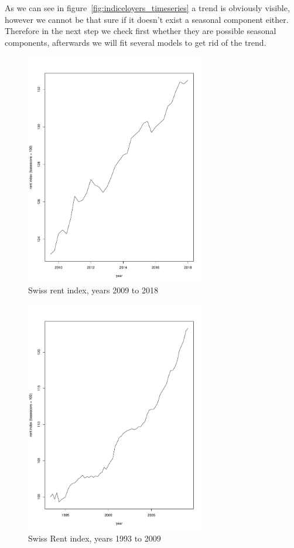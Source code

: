 \documentclass[11pt,a4paper]{article}
\begin{document}
As we can see in figure~\ref{fig:indiceloyers_timeseries} a trend is obviously visible, however we cannot be that sure if it doesn't exist a seasonal component either. Therefore in the next step we check first whether they are possible seasonal components, afterwards we will fit several models to get rid of the trend. 

\begin{figure}[!htb]
\centering
\includegraphics[angle=0,
width=0.7\textwidth]{indiceloyers_test}
\caption{Swiss rent index, years 2009 to 2018\label{fig:indiceloyers_test}}
\end{figure}
\begin{figure}[!htb]
\centering
\includegraphics[angle=0,
width=0.7\textwidth]{indiceloyers_train}
\caption{Swiss Rent index, years 1993 to 2009\label{fig:indiceloyers_train}}
\end{figure}
\end{document}
